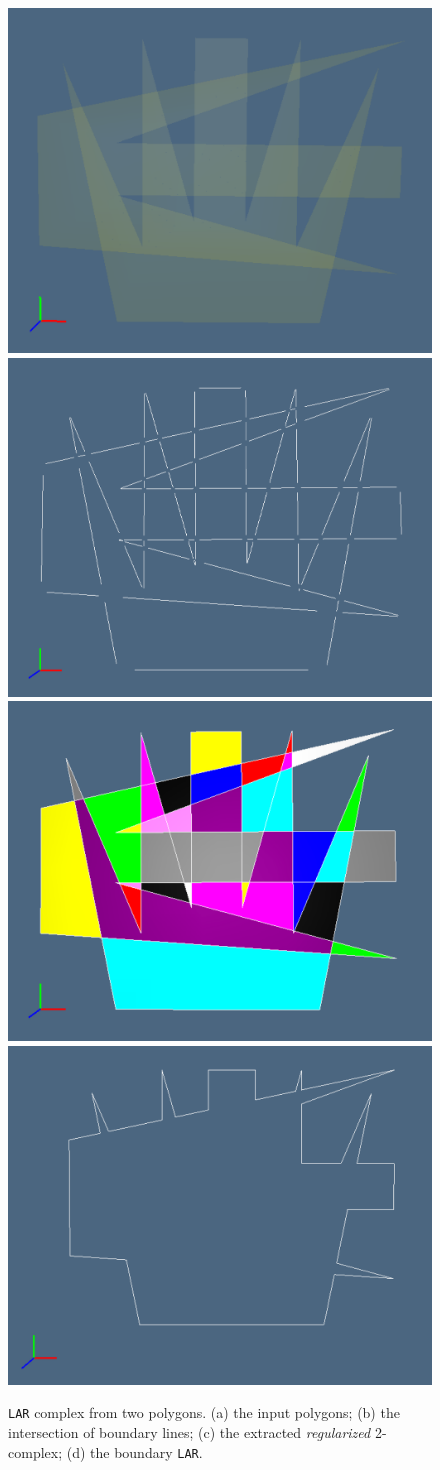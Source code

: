 \documentclass[11pt,oneside]{article}    %
\begin{document}
\begin{figure}[htbp] %
   \centering
   \includegraphics[height=0.2\linewidth,width=0.2425\linewidth]{images/fork1} 
   \includegraphics[height=0.2\linewidth,width=0.2425\linewidth]{images/fork2} 
   \includegraphics[height=0.2\linewidth,width=0.2425\linewidth]{images/fork3} 
   \includegraphics[height=0.2\linewidth,width=0.2425\linewidth]{images/fork4} 
   \caption{\texttt{LAR} complex from two polygons. (a) the input polygons; (b) the intersection of boundary lines; (c) the extracted \emph{regularized} 2-complex; (d) the boundary \texttt{LAR}.}
   \label{fig:ortho}
\end{figure}
\end{document}
